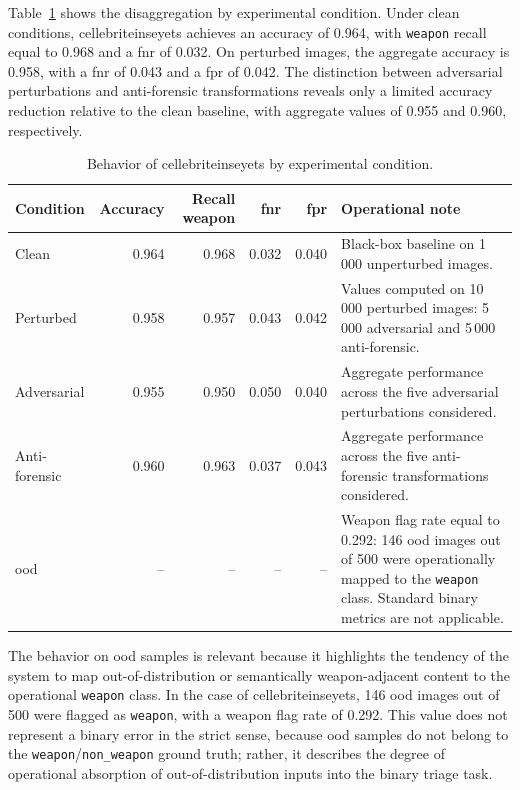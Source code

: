 Table~\ref{tab:results-cellebrite-condition-metrics} shows the disaggregation
by experimental condition. Under clean conditions, \gls{cellebriteinseyets}
achieves an accuracy of 0.964, with \texttt{weapon} recall equal to 0.968 and a
\gls{fnr} of 0.032. On perturbed images, the aggregate accuracy is 0.958, with
a \gls{fnr} of 0.043 and a \gls{fpr} of 0.042. The distinction between
adversarial perturbations and anti-forensic transformations reveals only a
limited accuracy reduction relative to the clean baseline, with aggregate
values of 0.955 and 0.960, respectively.

\begin{table}[H]
\centering
\caption{Behavior of \gls{cellebriteinseyets} by experimental condition.}
\label{tab:results-cellebrite-condition-metrics}
\small
\begin{tabularx}{\textwidth}{@{}l r r r r X@{}}
\toprule
\textbf{Condition} &
\textbf{Accuracy} &
\textbf{Recall weapon} &
\textbf{\gls{fnr}} &
\textbf{\gls{fpr}} &
\textbf{Operational note} \\
\midrule

Clean &
0.964 &
0.968 &
0.032 &
0.040 &
Black-box baseline on 1\,000 unperturbed images. \\

Perturbed &
0.958 &
0.957 &
0.043 &
0.042 &
Values computed on 10\,000 perturbed images: 5\,000 adversarial and 5\,000
anti-forensic. \\

Adversarial &
0.955 &
0.950 &
0.050 &
0.040 &
Aggregate performance across the five adversarial perturbations considered. \\

Anti-forensic &
0.960 &
0.963 &
0.037 &
0.043 &
Aggregate performance across the five anti-forensic transformations considered. \\

\gls{ood} &
-- &
-- &
-- &
-- &
Weapon flag rate equal to 0.292: 146 \gls{ood} images out of 500 were
operationally mapped to the \texttt{weapon} class. Standard binary metrics are
not applicable. \\

\bottomrule
\end{tabularx}
\end{table}

The behavior on \gls{ood} samples is relevant because it highlights the
tendency of the system to map out-of-distribution or semantically
weapon-adjacent content to the operational \texttt{weapon} class. In the case
of \gls{cellebriteinseyets}, 146 \gls{ood} images out of 500 were flagged as
\texttt{weapon}, with a weapon flag rate of 0.292. This value does not
represent a binary error in the strict sense, because \gls{ood} samples do not
belong to the \texttt{weapon}/\texttt{non\_weapon} ground truth; rather, it
describes the degree of operational absorption of out-of-distribution inputs
into the binary triage task.

